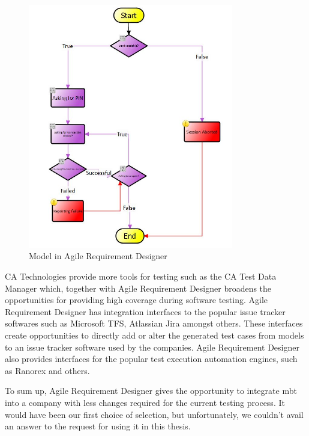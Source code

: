 \begin{figure} [htbp!]
	\centering
					\includegraphics[width=0.8\textwidth]{figures/AgileRequirementDesigner_Charts.JPG}
					\caption{\label{Fig:AgileRequirementDesigner_Charts} Model in Agile Requirement Designer}
\end{figure}

\par
CA Technologies provide more tools for testing such as the CA Test Data Manager which, together with Agile Requirement Designer broadens the opportunities for providing high coverage during software testing. Agile Requirement Designer has integration interfaces to the popular issue tracker softwares such as Microsoft TFS, Atlassian Jira amongst others. These interfaces create opportunities to directly add or alter the generated test cases from models to an issue tracker software used by the companies. Agile Requirement Designer also provides interfaces for the popular test execution automation engines, such as Ranorex and others.

\par
To sum up, Agile Requirement Designer gives the opportunity to integrate \acrshort{mbt} into a company with less changes required for the current testing process. It would have been our first choice of selection, but unfortunately, we couldn't avail an answer to the request for using it in this thesis.

